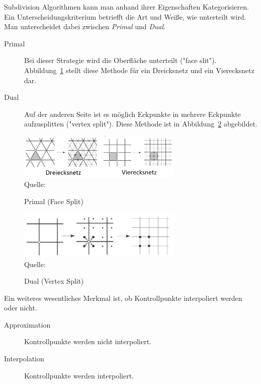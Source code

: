 Subdivision Algorithmen kann man anhand ihrer Eigenschaften Kategorisieren.
Ein Unterscheidungskriterium betriefft die Art und Weiße, wie unterteilt wird.
Man unterscheidet dabei zwischen \emph{Primal} und \emph{Dual}.
\begin{description}
 \item[Primal] Bei dieser Strategie wird die Oberfläche unterteilt ("face slit").
 Abbildung~\ref{fig:sd_primal} stellt diese Methode für ein Dreicksnetz und ein Vierecksnetz dar.
 \item[Dual] Auf der anderen Seite ist es möglich Eckpunkte in mehrere Eckpunkte aufzusplitten ("vertex split").
 Diese Methode ist in Abbildung~\ref{fig:sd_dual} abgebildet.
\end{description}
\begin{figure}[h]
  \caption{Primal (Face Split)}
  \centering
  \includegraphics[width=0.7\textwidth]{content/media/sd_primal}
  \\Quelle: \cite{Standford.24.07.2015}
  \label{fig:sd_primal}
\end{figure}
\begin{figure}[h]
  \caption{Dual (Vertex Split)}
  \centering
  \includegraphics[width=0.7\textwidth]{content/media/sd_dual}
  \\Quelle: \cite{Standford.24.07.2015}
  \label{fig:sd_dual}
\end{figure}

Ein weiteres wesentliches Merkmal ist, ob Kontrollpunkte interpoliert werden oder nicht. 
\begin{description}
 \item[Approximation] Kontrollpunkte werden nicht interpoliert.
 \item[Interpolation] Kontrollpunkte werden interpoliert.
\end{description}

